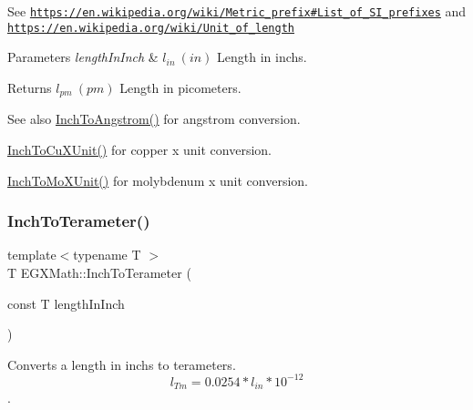 See \href{https://en.wikipedia.org/wiki/Metric_prefix#List_of_SI_prefixes}{\tt https\+://en.\+wikipedia.\+org/wiki/\+Metric\+\_\+prefix\#\+List\+\_\+of\+\_\+\+S\+I\+\_\+prefixes} and \href{https://en.wikipedia.org/wiki/Unit_of_length}{\tt https\+://en.\+wikipedia.\+org/wiki/\+Unit\+\_\+of\+\_\+length} 
\begin{DoxyParams}{Parameters}
{\em length\+In\+Inch} & $ l_{in}\ (in)$ Length in inchs. \\
\hline
\end{DoxyParams}
\begin{DoxyReturn}{Returns}
$ l_{pm}\ (pm)$ Length in picometers. 
\end{DoxyReturn}
\begin{DoxySeeAlso}{See also}
\mbox{\hyperlink{group___e_g_x_math-_conversions-_length_conversions-_imperial-_inch-_non-_s_i_ga37c2030e31292fe77b024bffaf4c7f9b}{Inch\+To\+Angstrom()}} for angstrom conversion. 

\mbox{\hyperlink{group___e_g_x_math-_conversions-_length_conversions-_imperial-_inch-_non-_s_i_ga90455aa8e1aaf26567c2b11fc24730c9}{Inch\+To\+Cu\+X\+Unit()}} for copper x unit conversion. 

\mbox{\hyperlink{group___e_g_x_math-_conversions-_length_conversions-_imperial-_inch-_non-_s_i_ga938a029b99c57c1b765ebf23e82dee6e}{Inch\+To\+Mo\+X\+Unit()}} for molybdenum x unit conversion. 
\end{DoxySeeAlso}
\mbox{\label{group___e_g_x_math-_conversions-_length_conversions-_imperial-_inch-_s_i_ga371a80e6577f6c2ba9101b383b910fad}} 
\subsubsection{\texorpdfstring{Inch\+To\+Terameter()}{InchToTerameter()}}
{\footnotesize\ttfamily template$<$typename T $>$ \\
T E\+G\+X\+Math\+::\+Inch\+To\+Terameter (\begin{DoxyParamCaption}\item[{const T}]{length\+In\+Inch }\end{DoxyParamCaption})}



Converts a length in inchs to terameters. \[ l_{Tm}=0.0254 * l_{in} * 10^{-12} \]. 

